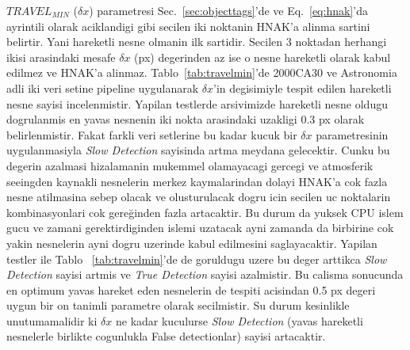 \documentclass[review]{elsarticle}
\begin{document}
$TRAVEL_{MIN}$ ($\delta{x}$) parametresi Sec.~\ref{sec:objecttags}'de ve Eq.~\ref{eq:hnak}'da ayrintili olarak aciklandigi gibi secilen iki noktanin HNAK'a alinma sartini belirtir. Yani hareketli nesne olmanin ilk sartidir. Secilen 3 noktadan herhangi ikisi arasindaki mesafe $\delta{x}$ (px) degerinden az ise o nesne hareketli olarak kabul edilmez ve HNAK'a alinmaz. Tablo~\ref{tab:travelmin}'de 2000CA30 ve Astronomia adli iki veri setine pipeline uygulanarak $\delta{x}$'in degisimiyle tespit edilen hareketli nesne sayisi incelenmistir. Yapilan testlerde arsivimizde hareketli nesne oldugu dogrulanmis en yavas nesnenin iki nokta arasindaki uzakligi 0.3 px olarak belirlenmistir. Fakat farkli veri setlerine bu kadar kucuk bir $\delta{x}$ parametresinin uygulanmasiyla \textit{Slow Detection} sayisinda artma meydana gelecektir. Cunku bu degerin azalmasi hizalamanin mukemmel olamayacagi gercegi ve atmosferik seeingden kaynakli nesnelerin merkez kaymalarindan dolayi HNAK'a cok fazla nesne atilmasina sebep olacak ve olusturulacak dogru icin secilen uc noktalarin kombinasyonlari cok gereğinden fazla artacaktir. Bu durum da yuksek CPU islem gucu ve zamani gerektirdiginden islemi uzatacak ayni zamanda da birbirine cok yakin nesnelerin ayni dogru uzerinde kabul edilmesini saglayacaktir. Yapilan testler ile Tablo ~\ref{tab:travelmin}'de de goruldugu uzere bu deger arttikca \textit{Slow Detection} sayisi artmis ve \textit{True Detection} sayisi azalmistir. Bu calisma sonucunda en optimum yavas hareket eden nesnelerin de tespiti acisindan 0.5 px degeri uygun bir on tanimli parametre olarak secilmistir. Su durum kesinlikle unutumamalidir ki $\delta{x}$ ne kadar kuculurse \textit{Slow Detection} (yavas hareketli nesnelerle birlikte cogunlukla False detectionlar) sayisi artacaktir.
\end{document}
